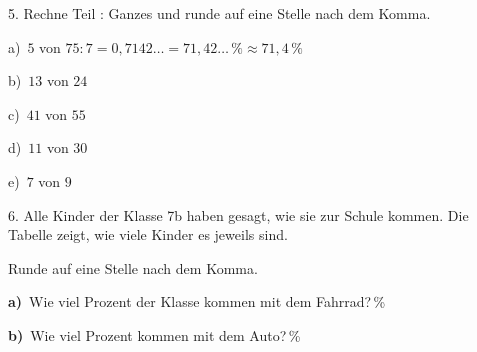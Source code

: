 \documentclass[11pt]{article}
\newcommand{\grau}[1]{{\color{mbgrau}#1}}
\begin{document}
\begin{pfaufg}{}{5.}{}
Rechne Teil : Ganzes und runde auf eine Stelle nach dem Komma.\par\medskip
\grau{a)\ $5$ von $7$\quad $5 : 7 = 0{,}7142\ldots = 71{,}42\ldots\,\% \approx 71{,}4\,\%$}\par\medskip
\noindent\begin{minipage}[t]{0.48\linewidth}
b)\ $13$ von $24$
\end{minipage}\hfill
\begin{minipage}[t]{0.48\linewidth}
c)\ $41$ von $55$
\end{minipage}
\noindent\begin{minipage}[t]{0.48\linewidth}
d)\ $11$ von $30$
\end{minipage}\hfill
\begin{minipage}[t]{0.48\linewidth}
e)\ $7$ von $9$
\end{minipage}
\end{pfaufg}

\begin{pfaufg}{}{6.}{}
Alle Kinder der Klasse 7b haben gesagt, wie sie zur Schule kommen. Die Tabelle zeigt, wie viele Kinder es jeweils sind.\par\medskip\noindent \begin{minipage}[t]{0.40\linewidth}\end{minipage}\hfill\begin{minipage}[t]{0.56\linewidth}\vspace{0pt}\raggedright Runde auf eine Stelle nach dem Komma.\par\medskip \textbf{a)}\ Wie viel Prozent der Klasse kommen mit dem Fahrrad?\linie{14mm}\,\%\par\medskip \textbf{b)}\ Wie viel Prozent kommen mit dem Auto?\linie{14mm}\,\%\end{minipage}\par
{}
\end{pfaufg}
\end{document}
